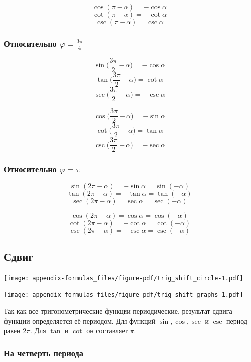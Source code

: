\documentclass[
  letterpaper,
  DIV=11,
  numbers=noendperiod]{scrreprt}
\theoremstyle{definition}
\theoremstyle{remark}
\begin{document}
\[\cos (\pi-\alpha) = -\cos \alpha\]
\[\cot (\pi-\alpha) = -\cot \alpha\] \[\csc (\pi-\alpha) = \csc \alpha\]

\subsubsection{\texorpdfstring{Относительно
\(\varphi = \frac{3\pi}{4}\)}{Относительно \textbackslash varphi = \textbackslash frac\{3\textbackslash pi\}\{4\}}}\label{trig_reflections_3pi2}

\[\sin \Big(\frac{3\pi}{2}-\alpha\Big) = -\cos \alpha\]
\[\tan \Big(\frac{3\pi}{2}-\alpha\Big) = \cot \alpha\]
\[\sec \Big(\frac{3\pi}{2}-\alpha\Big) = -\csc \alpha\]

\[\cos \Big(\frac{3\pi}{2}-\alpha\Big) = -\sin \alpha\]
\[\cot \Big(\frac{3\pi}{2}-\alpha\Big) = \tan \alpha\]
\[\csc \Big(\frac{3\pi}{2}-\alpha\Big) = -\sec \alpha\]

\subsubsection{\texorpdfstring{Относительно
\(\varphi = \pi\)}{Относительно \textbackslash varphi = \textbackslash pi}}\label{trig_reflections_pi}

\[\sin (2\pi - \alpha) = -\sin \alpha = \sin (-\alpha)\]
\[\tan (2\pi - \alpha) = -\tan \alpha = \tan (-\alpha)\]
\[\sec (2\pi - \alpha) = \sec \alpha = \sec (-\alpha)\]

\[\cos (2\pi - \alpha) = \cos \alpha = \cos (-\alpha)\]
\[\cot (2\pi - \alpha) = -\cot \alpha = \cot (-\alpha)\]
\[\csc (2\pi - \alpha) = -\csc \alpha = \csc (-\alpha)\]

\subsection{Сдвиг}\label{trig_shift}

\texttt{[image: appendix-formulas\_files/figure-pdf/trig\_shift\_circle-1.pdf]}

\texttt{[image: appendix-formulas\_files/figure-pdf/trig\_shift\_graphs-1.pdf]}

Так как все тригонометрические функции периодические, результат сдвига
функции определяется её периодом. Для функций \(\sin, \cos, \sec\) и
\(\csc\) период равен \(2\pi\). Для \(\tan\) и \(\cot\) он составляет
\(\pi\).

\subsubsection{На четверть периода}\label{trig_shift_by_one_quarter}
\end{document}
